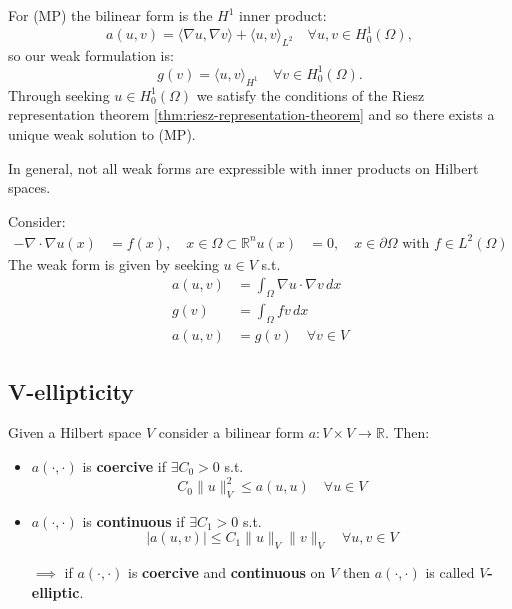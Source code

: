 \begin{corollary}{}{}
    For (MP) the bilinear form is the $H^1$ inner product:
    \[
        a(u, v) = \langle \nabla u, \nabla v \rangle + \langle u, v \rangle_{L^2} \quad \forall u, v \in H_0^1(\Omega),
    \]
    so our weak formulation is:
    \[
        g(v) = \langle u, v \rangle_{H^1} \quad \forall v \in H_0^1(\Omega).
    \]
    Through seeking $u \in H_0^1(\Omega)$ we satisfy the conditions of the Riesz representation theorem \ref{thm:riesz-representation-theorem} and so there exists a unique weak solution to (MP).
\end{corollary}

In general, not all weak forms are expressible with inner products on Hilbert spaces.

Consider:
\begin{align*}
    -\nabla \cdot \nabla u(x) & = f(x), \quad x \in \Omega \subset \mathbb{R}^n
    u(x)                      & = 0, \quad x \in \partial \Omega \text{ with } f \in L^2(\Omega)
\end{align*}
The weak form is given by seeking $u \in V$ s.t.
\begin{align*}
    a(u, v) & = \int_\Omega \nabla u \cdot \nabla v \, dx \\
    g(v)    & = \int_\Omega f v \, dx                     \\
    a(u, v) & = g(v) \quad \forall v \in V \tag{MP2}
\end{align*}

\subsection{V-ellipticity}

Given a Hilbert space $V$ consider a bilinear form $a: V \times V \to \mathbb{R}$. Then:
\begin{itemize}
    \item $a(\cdot, \cdot)$ is \textbf{coercive} if $\exists C_0 > 0$ s.t.
          \[
              C_0 \|u\|_V^2 \leq a(u, u) \quad \forall u \in V
          \]
    \item $a(\cdot, \cdot)$ is \textbf{continuous} if $\exists C_1 > 0$ s.t.
          \[
              |a(u, v)| \leq C_1 \|u\|_V \|v\|_V \quad \forall u, v \in V
          \]
    \item[$\implies$] if $a(\cdot, \cdot)$ is \textbf{coercive} and \textbf{continuous} on $V$ then $a(\cdot, \cdot)$ is called \textbf{$V$-elliptic}.
\end{itemize}

